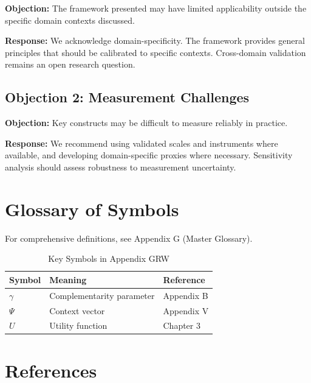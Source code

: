\textbf{Objection:} The framework presented may have limited applicability
outside the specific domain contexts discussed.

\textbf{Response:} We acknowledge domain-specificity. The framework provides
general principles that should be calibrated to specific contexts. Cross-domain
validation remains an open research question.

\subsection{Objection 2: Measurement Challenges}

\textbf{Objection:} Key constructs may be difficult to measure reliably in
practice.

\textbf{Response:} We recommend using validated scales and instruments where
available, and developing domain-specific proxies where necessary. Sensitivity
analysis should assess robustness to measurement uncertainty.



\section{Glossary of Symbols}
\label{sec:grw-glossary}

For comprehensive definitions, see Appendix G (Master Glossary).

\begin{table}[htbp]
\centering
\caption{Key Symbols in Appendix GRW}
\begin{tabular}{lll}
\toprule
\textbf{Symbol} & \textbf{Meaning} & \textbf{Reference} \\
\midrule
$\gamma$ & Complementarity parameter & Appendix B \\
$\Psi$ & Context vector & Appendix V \\
$U$ & Utility function & Chapter 3 \\
\bottomrule
\end{tabular}
\end{table}


\section{References}
\label{sec:grw-references}

